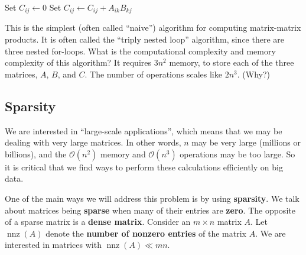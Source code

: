 \documentclass[12pt]{article}
\DeclareMathOperator{\nnz}{nnz}
\begin{document}
\begin{algorithm}[H]
   \caption{Dense matrix-matrix product (triply nested loop)}
   \begin{algorithmic}[1]
            \State Set $C_{ij} \gets 0$
               \State Set $C_{ij} \gets C_{ij} + A_{ik} B_{kj}$
            \EndFor
         \EndFor
      \EndFor
   \end{algorithmic}
\end{algorithm}

This is the simplest (often called ``naive'') algorithm for computing matrix-matrix products.
It is often called the ``triply nested loop'' algorithm, since there are three nested for-loops.
What is the computational complexity and memory complexity of this algorithm?
It requires $3 n^2$ memory, to store each of the three matrices, $A$, $B$, and $C$.
The number of operations scales like $2n^3$. (Why?)

\subsection*{Sparsity}

We are interested in ``large-scale applications'', which means that we may be dealing with very large matrices.
In other words, $n$ may be very large (millions or billions), and the $\mathcal{O}(n^2)$ memory and $\mathcal{O}(n^3)$ operations may be too large.
So it is critical that we find ways to perform these calculations efficiently on big data.

One of the main ways we will address this problem is by using \textbf{sparsity}.
We talk about matrices being \textbf{sparse} when many of their entries are \textbf{zero}.
The opposite of a sparse matrix is a \textbf{dense matrix}.
Consider an $m \times n$ matrix $A$.
Let $\nnz(A)$ denote the \textbf{number of nonzero entries} of the matrix $A$.
We are interested in matrices with $\nnz(A) \ll mn$.
\end{document}
